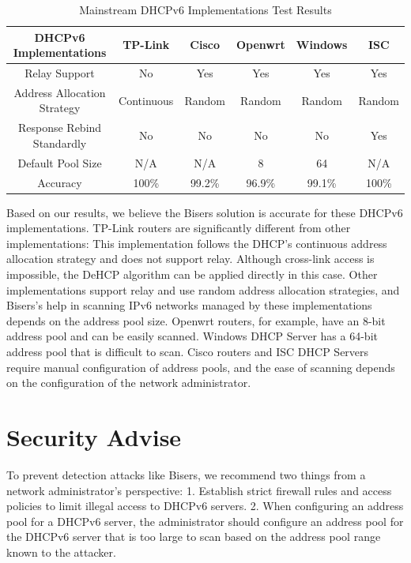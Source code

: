 \documentclass[conference]{IEEEtran}
\begin{document}
\begin{table}[htbp]
  \caption{Mainstream DHCPv6 Implementations Test Results}
  \label{tabDHCPv6Server}
  \centering
  \begin{tabular}{|c|c|c|c|c|c|}
    \hline
    DHCPv6 Implementations & TP-Link & Cisco & Openwrt & Windows & ISC \\
    \hline
    Relay Support & No & Yes & Yes & Yes & Yes \\
    Address Allocation Strategy & Continuous & Random & Random & Random & Random \\
    Response Rebind Standardly & No & No & No & No & Yes \\
    Default Pool Size & N/A & N/A & 8 & 64 & N/A \\
    Accuracy & 100\% & 99.2\% & 96.9\% & 99.1\% & 100\% \\
    \hline
  \end{tabular}
\end{table}

Based on our results, we believe the Bisers solution is accurate for
these DHCPv6 implementations. TP-Link routers are significantly
different from other implementations: This implementation follows the
DHCP's continuous address allocation strategy and does not support
relay. Although cross-link access is impossible, the DeHCP algorithm
can be applied directly in this case. Other implementations support
relay and use random address allocation strategies, and Bisers's help
in scanning IPv6 networks managed by these implementations depends on
the address pool size. Openwrt routers, for example, have an 8-bit
address pool and can be easily scanned. Windows DHCP Server has a
64-bit address pool that is difficult to scan. Cisco routers and ISC
DHCP Servers require manual configuration of address pools, and the
ease of scanning depends on the configuration of the network
administrator.

\section{Security Advise}

To prevent detection attacks like Bisers, we recommend two things from
a network administrator's perspective: 1. Establish strict firewall
rules and access policies to limit illegal access to DHCPv6
servers. 2. When configuring an address pool for a DHCPv6 server, the
administrator should configure an address pool for the DHCPv6 server
that is too large to scan based on the address pool range known to the
attacker.
\end{document}
